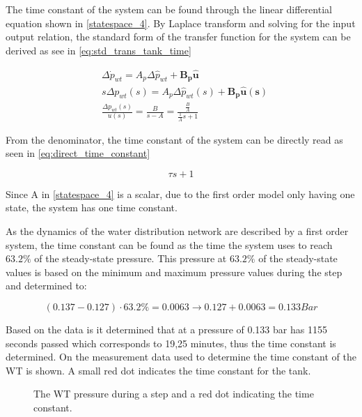 The time constant of the system can be found through the linear differential equation shown in \eqref{statespace_4}. By Laplace transform and solving for the input output relation, the standard form of the transfer function for the system can be derived as see in \eqref{eq:std_trans_tank_time}

\begin{equation}
	\begin{split}
	&\Delta \dot{p}_{wt} = A_p \Delta \hat{p}_{wt}  + \pmb{B_p}\pmb{\hat{u}}\\
	&s\Delta p_{wt}(s) = A_p \Delta \hat{p}_{wt}(s)  + \pmb{B_p}\pmb{\hat{u}(s)}\\
	&\frac{\Delta p_{wt}(s)}{u(s)} = \frac{B}{s-A} = \frac{\frac{B}{A}}{\frac{1}{A}s + 1}
	\end{split}
	\label{eq:std_trans_tank_time}
\end{equation}

From the denominator, the time constant of the system can be directly read as seen in \eqref{eq:direct_time_constant}

\begin{equation}
	\tau s + 1
	\label{eq:direct_time_constant}
\end{equation}

 Since A in \eqref{statespace_4} is a scalar, due to the first order model only having one state, the system has one time constant. 

As the dynamics of the water distribution network are described by a first order system, the time constant can be found as the time the system uses to reach $63.2\%$ of the steady-state pressure.
This pressure at $63.2\%$ of the steady-state values is based on the minimum and maximum pressure values during the step and determined to:

\begin{equation}
(0.137 - 0.127)\cdot63.2 \% = 0.0063 \rightarrow 0.127 + 0.0063 = 0.133 Bar 
\end{equation}

Based on the data is it determined that at a pressure of 0.133 bar has 1155 seconds passed which corresponds to 19,25 minutes, thus the time constant is determined. 
On  the measurement data used to determine the time constant of the WT is shown. A small red dot indicates the time constant for the tank.

\begin{figure}[H]

\caption{The WT pressure during a step and a red dot indicating the time constant.}
\label{fig:Test_WT_Timeconstant}
\end{figure}


